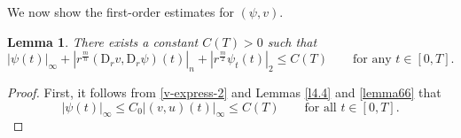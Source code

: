 \documentclass[11pt,reqno]{amsart}
\newtheorem{lem}{Lemma}[section]
\numberwithin{rk}{section}
\numberwithin{prop}{section}
\numberwithin{mydef}{section}
\numberwithin{lem}{section}
\numberwithin{equation}{section}
\numberwithin{thm}{section}
\begin{document}
We now show the first-order estimates for $(\psi,v)$.

\begin{lem}\label{l4.7}
There exists a constant $C(T)>0$ such that
\begin{equation*}\label{e4.34}
|\psi(t)|_\infty+ |r^{\frac{m}{n}}(\mathrm{D}_r v,\mathrm{D}_r \psi)(t)|_{n}+ |r^{\frac{m}{2}} \psi_t(t)|_{2}\leq C(T)\qquad \text{for any $t\in [0,T]$}.
\end{equation*}
\end{lem}
\begin{proof}
First, it follows from \eqref{v-express-2} and Lemmas \ref{l4.4} and \ref{lemma66} that
\begin{equation*}
|\psi(t)|_\infty\leq C_0|(v,u)(t)|_\infty\leq C(T)\qquad\text{for all $t\in [0,T]$}.    
\end{equation*}


\end{proof}
\end{document}
